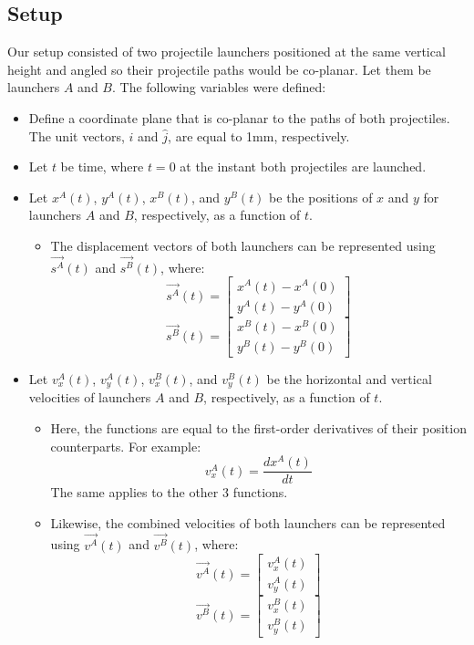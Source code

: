 \documentclass[12pt]{article}
\begin{document}
\subsection{Setup}

Our setup consisted of two projectile launchers positioned at the same vertical height and angled so their projectile paths would be co-planar. Let them be launchers $A$ and $B$.
The following variables were defined:
\begin{itemize}
    \item Define a coordinate plane that is co-planar to the paths of both projectiles. The unit vectors, $\hat{i}$ and $\hat{j}$, are equal to 1mm, respectively.
    \item Let $t$ be time, where $t=0$ at the instant both projectiles are launched.
    \item Let $x^A(t)$, $y^A(t)$, $x^B(t)$, and $y^B(t)$ be the positions of $x$ and $y$ for launchers $A$ and $B$, respectively, as a function of $t$.
    
    \begin{itemize}
        \item The displacement vectors of both launchers can be represented using $\vec{s^A}(t)$ and $\vec{s^B}(t)$, where:
        \[
        \vec{s^A}(t)= \begin{bmatrix} x^A(t) - x^A(0) \\ y^A(t) - y^A(0)\end{bmatrix}
        \]
        \[
        \vec{s^B}(t)= \begin{bmatrix} x^B(t) - x^B(0) \\ y^B(t) - y^B(0) \end{bmatrix}
        \]
    \end{itemize}

    \item Let $v_x^A(t)$, $v_y^A(t)$, $v_x^B(t)$, and $v_y^B(t)$ be the horizontal and vertical velocities of launchers $A$ and $B$, respectively, as a function of $t$. 
    
    \begin{itemize}
        
        \item Here, the functions are equal to the first-order derivatives of their position counterparts. For example: 
        \[
        v_x^A(t) = \frac{d x^A(t)}{dt}
        \]
        The same applies to the other 3 functions.
        \item Likewise, the combined velocities of both launchers can be represented using $\vec{v^A}(t)$ and $\vec{v^B}(t)$, where:
        \[
        \vec{v^A}(t)= \begin{bmatrix} v_x^A(t) \\ v_y^A(t) \end{bmatrix}
        \]
        \[
        \vec{v^B}(t)= \begin{bmatrix} v_x^B(t) \\ v_y^B(t) \end{bmatrix}
        \]
        

\end{itemize}
\end{itemize}
\end{document}
